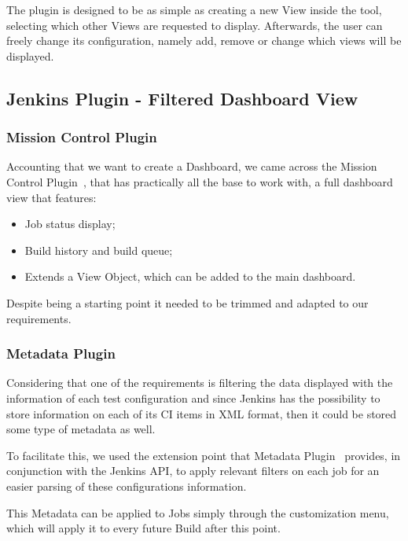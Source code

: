 \documentclass[9pt,a4paper]{extarticle}
\begin{document}
\begin{multicols}{2}
The plugin is designed to be as simple as creating a new View inside the tool, selecting which other Views are requested to display. Afterwards, the user can freely change its configuration, namely add, remove or change which views will be displayed.

\subsection{Jenkins Plugin - Filtered Dashboard View}\label{sc:dashboard}

\subsubsection{Mission Control Plugin}\label{mission_plugin}

Accounting that we want to create a Dashboard, we came across the Mission Control Plugin~\cite{jkns:missionC}, that has practically all the base to work with, a full dashboard view that features:

\begin{itemize}
\item Job status display;
\item Build history and build queue;
\item Extends a View Object, which can be added to the main dashboard.
\end{itemize}

Despite being a starting point it needed to be trimmed and adapted to our requirements. 

\subsubsection{Metadata Plugin}\label{metadata_plugin}

Considering that one of the requirements is filtering the data displayed with the information of each test configuration and since Jenkins has the possibility to store information on each of its CI items in XML format, then it could be stored some type of metadata as well.

To facilitate this, we used the extension point that Metadata Plugin~\cite{jkns:metadata} provides, in conjunction with the Jenkins API, to apply relevant filters on each job for an easier parsing of these configurations information.

This Metadata can be applied to Jobs simply through the customization menu, which will apply it to every future Build after this point. 


\end{multicols}
\end{document}
